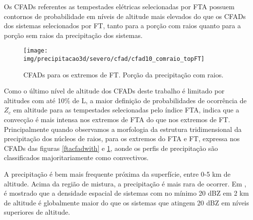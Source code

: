 Os CFADs referentes as tempestades elétricas selecionadas por FTA possuem contornos de probabilidade em níveis de altitude mais elevados do que os CFADs dos sistemas selecionados por FT, tanto para a porção com raios quanto para a porção sem raios da precipitação dos sistemas.


\begin{figure}[!ht]
  \centering
  \texttt{[image: img/precipitacao3d/severo/cfad/cfad10\_comraio\_topFT]}
  \caption{CFADs para os extremos de FT. Porção da precipitação com raios.}
  \label{ftcfadwith}   
\end{figure} 


Como o último nível de altitude dos CFADs deste trabalho é limitado por altitudes com até 10\% de L, a maior definição de probabilidades de ocorrência de $Z_c$ em altitude para as tempestades selecionadas pelo índice FTA, indica que a convecção é mais intensa nos extremos de FTA do que nos extremos de FT. Principalmente quando observamos a morfologia da estrutura tridimensional da precipitação dos núcleos de raios, para os extremos do FTA e FT, expressa nos CFADs das figuras \ref{ftacfadwith} e \ref{ftcfadwith}, aonde os perfis de precipitação são classificados majoritariamente como convectivos.

A precipitação é bem mais frequente próxima da superfície, entre 0-5 km de altitude. Acima da região de mistura, a precipitação é mais rara de ocorrer. Em \cite{liu2008}, é mostrado que a densidade espacial de sistemas com no mínimo 20 dBZ em 2 km de altitude é globalmente maior do que os sistemas que atingem 20 dBZ em níveis superiores de altitude.


